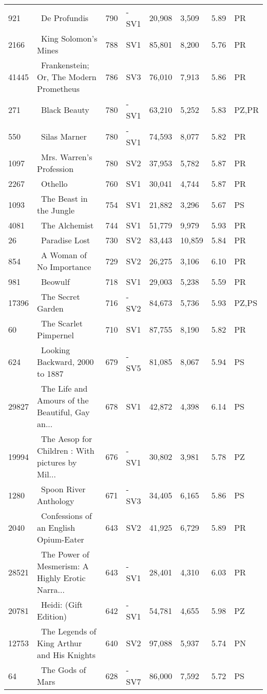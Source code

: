 \begin{longtable}{l | l | l | l | l | l | l | l}
921 & ~De Profundis & 790 & -SV1 & 20,908 & 3,509 & 5.89 & PR\\
2166 & ~King Solomon's Mines & 788 & SV1 & 85,801 & 8,200 & 5.76 & PR\\
41445 & ~Frankenstein; Or, The Modern Prometheus & 786 & SV3 & 76,010 & 7,913 & 5.86 & PR\\
271 & ~Black Beauty & 780 & -SV1 & 63,210 & 5,252 & 5.83 & PZ,PR\\
550 & ~Silas Marner & 780 & -SV1 & 74,593 & 8,077 & 5.82 & PR\\
1097 & ~Mrs. Warren's Profession & 780 & SV2 & 37,953 & 5,782 & 5.87 & PR\\
2267 & ~Othello & 760 & SV1 & 30,041 & 4,744 & 5.87 & PR\\
1093 & ~The Beast in the Jungle & 754 & SV1 & 21,882 & 3,296 & 5.67 & PS\\
4081 & ~The Alchemist & 744 & SV1 & 51,779 & 9,979 & 5.93 & PR\\
26 & ~Paradise Lost & 730 & SV2 & 83,443 & 10,859 & 5.84 & PR\\
854 & ~A Woman of No Importance & 729 & SV2 & 26,275 & 3,106 & 6.10 & PR\\
981 & ~Beowulf & 718 & SV1 & 29,003 & 5,238 & 5.59 & PR\\
17396 & ~The Secret Garden & 716 & -SV2 & 84,673 & 5,736 & 5.93 & PZ,PS\\
60 & ~The Scarlet Pimpernel & 710 & SV1 & 87,755 & 8,190 & 5.82 & PR\\
624 & ~Looking Backward, 2000 to 1887 & 679 & -SV5 & 81,085 & 8,067 & 5.94 & PS\\
29827 & ~The Life and Amours of the Beautiful, Gay an... & 678 & SV1 & 42,872 & 4,398 & 6.14 & PS\\
19994 & ~The Aesop for Children
: With pictures by Mil... & 676 & -SV1 & 30,802 & 3,981 & 5.78 & PZ\\
1280 & ~Spoon River Anthology & 671 & -SV3 & 34,405 & 6,165 & 5.86 & PS\\
2040 & ~Confessions of an English Opium-Eater & 643 & SV2 & 41,925 & 6,729 & 5.89 & PR\\
28521 & ~The Power of Mesmerism: A Highly Erotic Narra... & 643 & -SV1 & 28,401 & 4,310 & 6.03 & PR\\
20781 & ~Heidi: (Gift Edition) & 642 & -SV1 & 54,781 & 4,655 & 5.98 & PZ\\
12753 & ~The Legends of King Arthur and His Knights & 640 & SV2 & 97,088 & 5,937 & 5.74 & PN\\
64 & ~The Gods of Mars & 628 & -SV7 & 86,000 & 7,592 & 5.72 & PS\\

\end{longtable}
